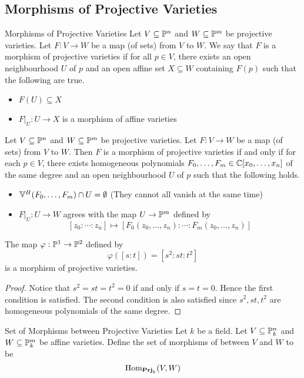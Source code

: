 \documentclass[a4paper]{article}
\begin{document}
\subsection{Morphisms of Projective Varieties}
\begin{defn}{Morphisms of Projective Varieties}{} Let $V\subseteq\mathbb{P}^n$ and $W\subseteq\mathbb{P}^m$ be projective varieties. Let $F:V\to W$ be a map (of sets) from $V$ to $W$. We say that $F$ is a morphism of projective varieties if for all $p\in V$, there exists an open neighbourhood $U$ of $p$ and an open affine set $X\subseteq W$ containing $F(p)$ such that the following are true. 
\begin{itemize}
\item $F(U)\subseteq X$
\item $F|_U:U\to X$ is a morphism of affine varieties
\end{itemize}
\end{defn}

\begin{prp}{}{} Let $V\subseteq\mathbb{P}^n$ and $W\subseteq\mathbb{P}^m$ be projective varieties. Let $F:V\to W$ be a map (of sets) from $V$ to $W$. Then $F$ is a morphism of projective varieties if and only if for each $p\in V$, there exists homogeneous polynomials $F_0,\dots,F_m\in\mathbb{C}[x_0,\dots,x_n]$ of the same degree and an open neighbourhood $U$ of $p$ such that the following holds. 
\begin{itemize}
\item $\mathbb{V}^H(F_0,\dots,F_m)\cap U=\emptyset$ (They cannot all vanish at the same time)
\item $F|_U:U\to W$ agrees with the map $U\to\mathbb{P}^m$ defined by $$[z_0:\cdots:z_n]\mapsto[F_0(z_0,\dots,z_n):\cdots:F_m(z_0,\dots,z_n)]$$
\end{itemize}
\end{prp}

\begin{eg}{}{} The map $\varphi:\mathbb{P}^1\to\mathbb{P}^2$ defined by $$\varphi([s:t])=[s^2:st:t^2]$$ is a morphism of projective varieties. \tcbline
\begin{proof}
Notice that $s^2=st=t^2=0$ if and only if $s=t=0$. Hence the first condition is satisfied. The second condition is also satisfied since $s^2,st,t^2$ are homogeneous polynomials of the same degree. 
\end{proof}
\end{eg}

\begin{defn}{Set of Morphisms between Projective Varieties}{} Let $k$ be a field. Let $V\subseteq\mathbb{P}_k^n$ and $W\subseteq\mathbb{P}_k^m$ be affine varieties. Define the set of morphisms of between $V$ and $W$ to be $$\operatorname{Hom}_{\bold{Prj}_k}(V,W)$$
\end{defn}
\end{document}
